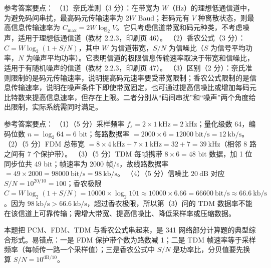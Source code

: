 \documentclass[a4paper,11pt]{article}
\begin{document}
\q 参考答案要点：
（1）奈氏准则（3 分）：在带宽为 $W$（Hz）的理想低通信道中，为避免码间串扰，最高码元传输速率为 $2W$ Baud；若码元有 $V$ 种离散状态，则最高信息传输速率为 $C_{\max}=2W\log_2 V$。它只考虑信道带宽和码元种类，不考虑噪声，适用于理想低通信道（教材 2.2.3，印刷页 46）。
（2）香农公式（3 分）：$C=W\log_2(1+S/N)$，其中 $W$ 为信道带宽，$S/N$ 为信噪比（$S$ 为信号平均功率，$N$ 为噪声平均功率）。它表明信道的极限信息传输速率取决于带宽和信噪比，适用于有随机噪声的信道（教材 2.2.3，印刷页 47）。
（3）区别（2 分）：奈氏准则限制的是码元传输速率，说明提高码元速率要受带宽限制；香农公式限制的是信息传输速率，说明在噪声条件下即使带宽固定，也可通过提高信噪比或增加每码元比特数来提高信息速率，但存在上限。二者分别从“码间串扰”和“噪声”两个角度给出限制，实际系统需同时满足。


\q 参考答案要点：
（1）（5 分）采样频率 $f_s=2\times1\ \text{kHz}=2\ \text{kHz}$；量化级数 64，编码位数 $n=\log_2 64=6$ bit；每路数据率 $=2000\times6=12000\ \text{bit/s}=12\ \text{kb/s}$。
（2）（5 分）FDM 总带宽 $=8\times4\ \text{kHz}+7\times1\ \text{kHz}=32+7=39\ \text{kHz}$（相邻 8 路之间有 7 个保护带）。
（3）（5 分）TDM 每帧携带 $8\times6=48$ bit 数据，加 1 位同步位共 $49$ bit；帧速率为 2000 帧/s，故线路数据率 $=49\times2000=98000\ \text{bit/s}=98\ \text{kb/s}$。
（4）（5 分）信噪比 $20\ \text{dB}$ 对应 $S/N=10^{20/10}=100$；香农极限 $C=W\log_2(1+S/N)=10000\times\log_2 101\approx10000\times6.66=66600\ \text{bit/s}\approx66.6\ \text{kb/s}$。因为 $98\ \text{kb/s}>66.6\ \text{kb/s}$，超过香农极限，所以第（3）问的 TDM 数据率不能在该信道上可靠传输；需增大带宽、提高信噪比、降低采样率或压缩数据。
\begin{analysis}本题把 PCM、FDM、TDM 与香农公式串起来，是 341 网络部分计算题的典型综合形式。易错点：一是 FDM 保护带个数为路数减 1；二是 TDM 帧速率等于采样频率（每帧传一路一个采样值）；三是香农公式中 $S/N$ 是功率比，分贝值要先换算 $S/N=10^{\text{dB}/10}$。\end{analysis}
\end{document}
